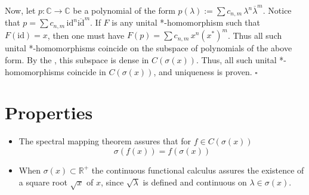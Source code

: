 \documentclass[12pt]{article}
\begin{document}
Now, let $p: \mathbb{C} \to \mathbb{C}$ be a polynomial of the form $p(\lambda):= \sum c_{n,m}\, \lambda^n \overline{\lambda}^m$. Notice that $p = \sum c_{n,m}\, \mathrm{id}^n \overline{\mathrm{id}}^m$. If $F$ is any unital *-homomorphism such that $F(\mathrm{id})= x$, then one must have $F(p) = \sum c_{n,m}\, x^n(x^*)^m$. Thus all such unital *-homomorphisms coincide on the subspace of polynomials of the above form. By the , this subspace is dense in $C(\sigma(x))$. Thus, all such unital *-homomorphisms coincide in $C(\sigma(x))$, and uniqueness is proven. $\square$

\section{Properties}
\begin{itemize}
\item The spectral mapping theorem assures that for $f \in C(\sigma(x))$
\begin{displaymath}
\sigma(f(x)) = f(\sigma(x))
\end{displaymath}

\item When $\sigma(x) \subset \mathbb{R}^+$ the continuous functional calculus assures the existence of a square root $\sqrt{x}$ of $x$, since $\sqrt{\lambda}$ is defined and continuous on $\lambda \in \sigma(x)$. 
\end{itemize}
\end{document}
